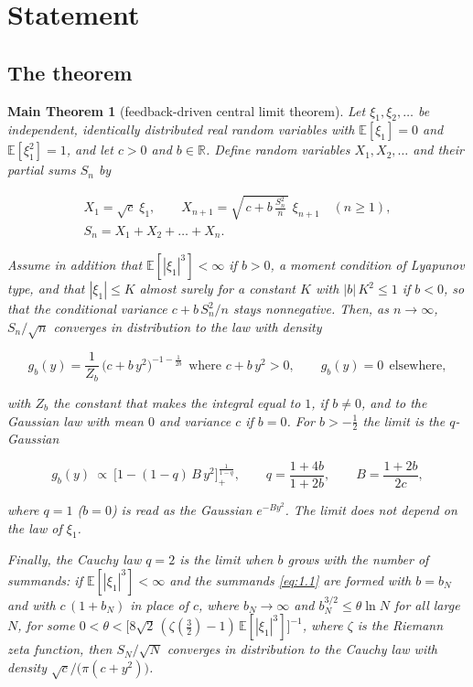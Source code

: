 \documentclass[aip,jmp,preprint,onecolumn,floatfix,superscriptaddress,nofootinbib,11pt]{revtex4-2}
\theoremstyle{plain}
\newtheorem*{maintheorem}{Main Theorem}
\theoremstyle{remark}
\numberwithin{equation}{section}
\newcommand{\E}{\mathbb{E}}
\begin{document}
\section{Statement}\label{sec:1}

\subsection{The theorem}\label{sec:1_1}

\begin{maintheorem}[feedback-driven central limit theorem]

Let $\xi_1,\xi_2,\dots$ be independent, identically distributed real random variables with $\E[\xi_1]=0$ and $\E[\xi_1^{2}]=1$, and let $c>0$ and $b\in\mathbb R$. Define random variables $X_1,X_2,\dots$ and their partial sums $S_n$ by

\begin{equation}
\begin{gathered} X_1=\sqrt c\;\xi_1,\qquad X_{n+1}=\sqrt{\,c+b\,\frac{S_n^{2}}{n}\,}\;\xi_{n+1}\quad(n\ge1),\\[4pt] S_n=X_1+X_2+\dots+X_n . \end{gathered}
\label{eq:1.1}
\end{equation}

Assume in addition that $\E[|\xi_1|^{3}]<\infty$ if $b>0$, a moment condition of Lyapunov type, and that $|\xi_1|\le K$ almost surely for a constant $K$ with $|b|\,K^{2}\le1$ if $b<0$, so that the conditional variance $c+b\,S_n^{2}/n$ stays nonnegative. Then, as $n\to\infty$, $S_n/\sqrt n$ converges in distribution to the law with density

\begin{equation}
g_b(y)=\frac{1}{Z_b}\,\big(c+b\,y^{2}\big)^{-1-\frac{1}{2b}}\ \ \text{where } c+b\,y^{2}>0,\qquad g_b(y)=0\ \ \text{elsewhere},
\label{eq:1.2}
\end{equation}

with $Z_b$ the constant that makes the integral equal to $1$, if $b\ne0$, and to the Gaussian law with mean $0$ and variance $c$ if $b=0$. For $b>-\tfrac12$ the limit is the $q$-Gaussian

\begin{equation}
g_b(y)\ \propto\ \Big[1-(1-q)\,B\,y^{2}\Big]_{+}^{\frac{1}{1-q}},\qquad q=\frac{1+4b}{1+2b},\qquad B=\frac{1+2b}{2c},
\label{eq:1.3}
\end{equation}

where $q=1$ ($b=0$) is read as the Gaussian $e^{-By^{2}}$. The limit does not depend on the law of $\xi_1$.

Finally, the Cauchy law $q=2$ is the limit when $b$ grows with the number of summands: if $\E[|\xi_1|^{3}]<\infty$ and the summands \eqref{eq:1.1} are formed with $b=b_N$ and with $c\,(1+b_N)$ in place of $c$, where $b_N\to\infty$ and $b_N^{3/2}\le\theta\ln N$ for all large $N$, for some $0<\theta<\big[8\sqrt2\,(\zeta(\tfrac32)-1)\,\E[|\xi_1|^{3}]\big]^{-1}$, where $\zeta$ is the Riemann zeta function, then $S_N/\sqrt N$ converges in distribution to the Cauchy law with density $\sqrt c/\big(\pi(c+y^{2})\big)$.

\end{maintheorem}
\end{document}
